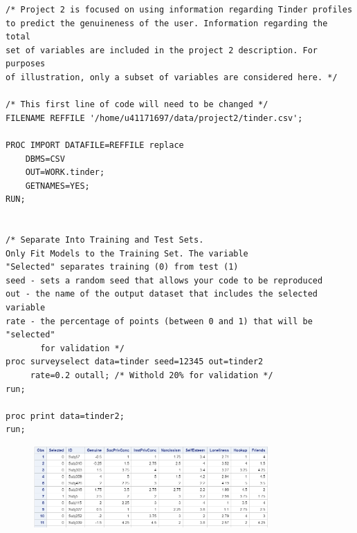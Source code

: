 \documentclass[12pt]{../notes}
\begin{document}

\begin{verbatim}
/* Project 2 is focused on using information regarding Tinder profiles 
to predict the genuineness of the user. Information regarding the total 
set of variables are included in the project 2 description. For purposes
of illustration, only a subset of variables are considered here. */

/* This first line of code will need to be changed */
FILENAME REFFILE '/home/u41171697/data/project2/tinder.csv';

PROC IMPORT DATAFILE=REFFILE replace
	DBMS=CSV
	OUT=WORK.tinder;
	GETNAMES=YES;
RUN;


/* Separate Into Training and Test Sets. 
Only Fit Models to the Training Set. The variable
"Selected" separates training (0) from test (1) 
seed - sets a random seed that allows your code to be reproduced
out - the name of the output dataset that includes the selected variable 
rate - the percentage of points (between 0 and 1) that will be "selected" 
       for validation */ 
proc surveyselect data=tinder seed=12345 out=tinder2
     rate=0.2 outall; /* Withold 20% for validation */
run;

proc print data=tinder2;
run;

\end{verbatim}

\begin{figure}[H]
\centering
\includegraphics[width=0.8\textwidth]{../figures/module3/survey_select_output_example.png}
\end{figure}
\end{document}
